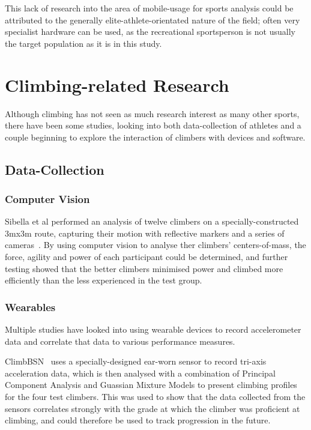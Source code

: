 This lack of research into the area of mobile-usage for sports analysis could be attributed to the generally elite-athlete-orientated nature of the field;
often very specialist hardware can be used, as the recreational sportsperson is not usually the target population as it is in this study.


\section{Climbing-related Research}
Although climbing has not seen as much research interest as many other sports, there have been some studies, looking into both data-collection of athletes and a couple beginning to explore the interaction of climbers with devices and software.


\subsection{Data-Collection}

\subsubsection{Computer Vision}
Sibella et al performed an analysis of twelve climbers on a specially-constructed 3mx3m route, capturing their motion with reflective markers and a series of cameras~\cite{centreofmass}.
By using computer vision to analyse ther climbers' centers-of-mass, the force, agility and power of each participant could be determined, and further testing showed that the better climbers minimised power and climbed more efficiently than the less experienced in the test group.



\subsubsection{Wearables}
Multiple studies have looked into using wearable devices to record accelerometer data and correlate that data to various performance measures.

ClimbBSN~\cite{climbbsn} uses a specially-designed ear-worn  sensor to record tri-axis acceleration data, which is then analysed with a combination of Principal Component Analysis and Guassian Mixture Models to present climbing profiles for the four test climbers.
This was used to show that the data collected from the sensors correlates strongly with the grade at which the climber was proficient at climbing, and could therefore be used to track progression in the future.



